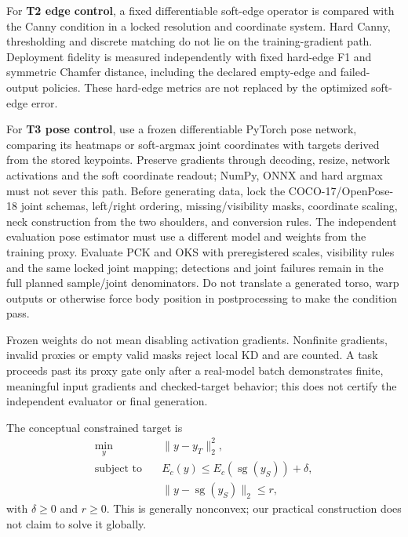 \documentclass{article}
\newcommand{\sg}{\operatorname{sg}}
\begin{document}
For \textbf{T2 edge control}, a fixed differentiable soft-edge operator is compared with the Canny condition in a locked resolution and coordinate system. Hard Canny, thresholding and discrete matching do not lie on the training-gradient path. Deployment fidelity is measured independently with fixed hard-edge F1 and symmetric Chamfer distance, including the declared empty-edge and failed-output policies. These hard-edge metrics are not replaced by the optimized soft-edge error.

For \textbf{T3 pose control}, use a frozen differentiable PyTorch pose network, comparing its heatmaps or soft-argmax joint coordinates with targets derived from the stored keypoints. Preserve gradients through decoding, resize, network activations and the soft coordinate readout; NumPy, ONNX and hard argmax must not sever this path. Before generating data, lock the COCO-17/OpenPose-18 joint schemas, left/right ordering, missing/visibility masks, coordinate scaling, neck construction from the two shoulders, and conversion rules. The independent evaluation pose estimator must use a different model and weights from the training proxy. Evaluate PCK and OKS with preregistered scales, visibility rules and the same locked joint mapping; detections and joint failures remain in the full planned sample/joint denominators. Do not translate a generated torso, warp outputs or otherwise force body position in postprocessing to make the condition pass.

Frozen weights do not mean disabling activation gradients. Nonfinite gradients, invalid proxies or empty valid masks reject local KD and are counted. A task proceeds past its proxy gate only after a real-model batch demonstrates finite, meaningful input gradients and checked-target behavior; this does not certify the independent evaluator or final generation.

The conceptual constrained target is
\begin{align}
 \min_y\quad &\|y-y_T\|_2^2,\label{eq:ideal}\\
 \text{subject to}\quad&E_c(y)\le E_c(\sg(y_S))+\delta,\nonumber\\
 &\|y-\sg(y_S)\|_2\le r,\nonumber
\end{align}
with $\delta\ge0$ and $r\ge0$. This is generally nonconvex; our practical construction does not claim to solve it globally.
\end{document}
